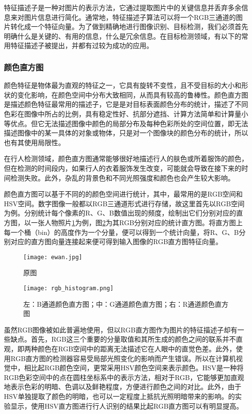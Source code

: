   特征描述子是一种对图片的表示方法，它通过提取图片中的关键信息并丢弃多余信息来对图片信息进行简化。通常地，特征描述子算法可以将一个RGB三通道的图片转化成一个特征向量。为了做到精确地进行图像识别、目标检测，我们必须首先明确什么是关键的、有用的信息，什么是冗余信息。在目标检测领域，有以下的常用特征描述子被提出，并都有过较为成功的应用。

\subsubsection{颜色直方图}

  颜色特征是物体最为直观的特征之一，它具有旋转不变性，且不受目标的大小和形状的变化影响，在颜色空间中分布大致相同，从而具有较高的鲁棒性。颜色直方图是描述颜色特征最常用的描述子，它是是对目标表面颜色分布的统计，描述了不同色彩在图像中所占的比例，具有稳定性好、抗部分遮挡、计算方法简单和计算量小等优点。但它无法描述图像中颜色的局部分布及每种色彩所处的空间位置，即无法描述图像中的某一具体的对象或物体，只是对一个图像块的颜色分布的统计，所以也有其使用局限性。

  在行人检测领域，颜色直方图通常能够很好地描述行人的肤色或所着服饰的颜色，但在检测的时间段内，如果行人的衣着服饰发生改变，可能就会导致在接下来的时间检测失败。此外，杂乱的背景色和不同光照强度和颜色也会产生较大影响。

  颜色直方图可以基于不同的的颜色空间进行统计，其中，最常用的是RGB空间和HSV空间。数字图像一般都以RGB三通道形式进行存储，故这里首先以RGB空间为例。分别统计每个像素的R、G、B数值出现的频度，绘制出它们分别对应的直方图，以一张人物照片\ref{fig:ewan}为例，图\ref{fig:rgbhistogram}为其RGB分别对应的统计直方图。将直方图上每一个桶（bin）的高度作为一个分量，便可以得到一个统计向量，将R、G、B分别对应的直方图向量连接起来便可得到输入图像的RGB直方图特征向量。

\begin{figure}[htb]
  \centering
  \texttt{[image: ewan.jpg]}
  \caption{原图}
  \label{fig:ewan}
\end{figure}

\begin{figure}[htb]
  \centering
  \texttt{[image: rgb\_histogram.png]}
  \caption{左：B通道颜色直方图；中：G通道颜色直方图；右：R通道颜色直方图}
  \label{fig:rgbhistogram}
\end{figure}

  虽然RGB图像被如此普遍地使用，但以RGB直方图作为图片的特征描述子却有一些缺点。首先，RGB这三个重要的分量取值和其所生成的颜色之间的联系并不直观，即两种颜色在RGB空间中的距离无法描述它在人眼中的直觉色差。此外，使用RGB直方图的检测器容易受局部光照变化的影响而产生错误。所以在计算机视觉中，相比起RGB颜色空间，更常采用HSV颜色空间来表示颜色。HSV是一种将RGB色彩空间中的点在圆柱坐标系中的表示方法，相对于RGB，它能够更加直观地表示色彩的明暗、色调以及鲜艳程度，方便进行颜色之间的对比。此外，由于HSV单独提取了颜色的明暗，也可以一定程度上抵抗光照明暗带来的影响。\citet{sural2002segmentation}的实验显示，使用HSV直方图进行行人识别的结果比起RGB直方图可以有明显提高。

